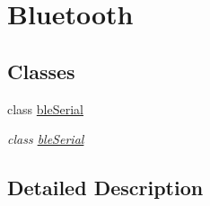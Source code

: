 \hypertarget{group___bluetooth}{\section{Bluetooth}
\label{group___bluetooth}
}
\subsection*{Classes}
\begin{DoxyCompactItemize}
\item 
class \hyperlink{classble_serial}{ble\-Serial}
\begin{DoxyCompactList}\small\item\em class \hyperlink{classble_serial}{ble\-Serial} \end{DoxyCompactList}\end{DoxyCompactItemize}


\subsection{Detailed Description}
